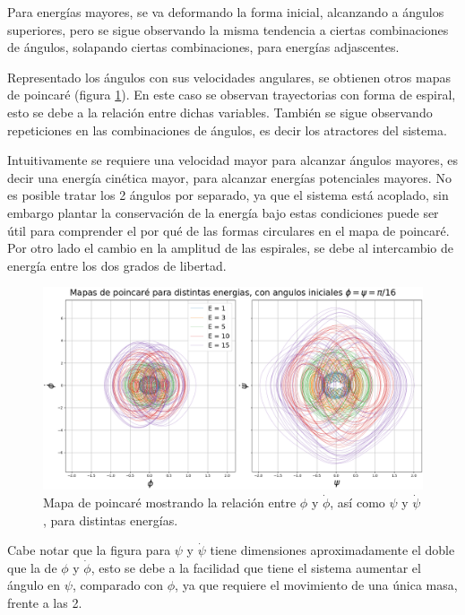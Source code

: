 \documentclass[11pt, twoside]{article} %
\begin{document}
Para energías mayores, se va deformando la forma inicial, alcanzando a 
ángulos superiores, pero se sigue observando la misma tendencia a ciertas 
combinaciones de ángulos, solapando ciertas combinaciones, para energías
adjascentes.

Representado los ángulos con sus velocidades angulares, se obtienen otros 
mapas de poincaré (figura \ref{fig:poincare_energias_phi_psi}). En este caso
se observan trayectorias con forma de espiral, esto se debe a la relación entre
dichas variables. También se sigue observando repeticiones en las combinaciones
de ángulos, es decir los atractores del sistema.

Intuitivamente se requiere una velocidad mayor para alcanzar ángulos mayores,
es decir una energía cinética mayor, para alcanzar energías potenciales mayores. 
No es posible tratar los 2 ángulos por separado, ya que el sistema está acoplado, 
sin embargo plantar la conservación de la energía bajo estas condiciones 
puede ser útil para comprender el por qué de las formas circulares en el mapa de
poincaré. Por otro lado el cambio en la amplitud de las espirales, se debe al 
intercambio de energía entre los dos grados de libertad.

\begin{figure}[h!]
    \centering
    \includegraphics[width=\textwidth]{plots/poincare_energias_phi_psi.png}
    \caption{Mapa de poincaré mostrando la relación entre $\phi$ y $\dot{\phi}$, 
    así como $\psi$ y $\dot{\psi}$, para distintas energías.}
    \label{fig:poincare_energias_phi_psi}
\end{figure}

Cabe notar que la figura para $\psi$ y $\dot{\psi}$ tiene dimensiones 
aproximadamente el doble que la de $\phi$ y $\dot{\phi}$, esto se debe a
la facilidad que tiene el sistema aumentar el ángulo en $\psi$, comparado 
con $\phi$, ya que requiere el movimiento de una única masa, frente a las 2.
\end{document}
